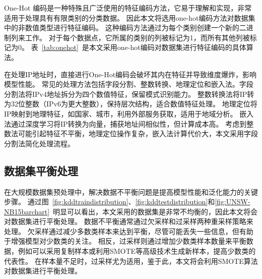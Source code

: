 One-Hot 编码是一种特殊且广泛使用的特征编码方法，它易于理解和实现，非常适用于处理具有有限类别的分类数据。
因此本文将选用one-hot编码方法对数据集中的非数值类型进行特征编码。
这种编码方法通过为每个类别创建一个新的二进制列来工作。
对于每个数据点，它所属的类别的列被标记为1，而所有其他列被标记为0。
表~\ref{tab:onehot}~是本文采用one-hot编码对数据集进行特征编码的具体算法。\par


在处理IP地址时，直接进行One-Hot编码会破坏其内在特征并导致维度爆炸，影响模型性能。
常见的处理方法包括字段分割、整数转换、地理定位和嵌入法。字段分割法将IPv4地址拆分为四个数值特征，保留模式识别能力。
整数转换法将IP转为32位整数（IPv6为更大整数），保持层次结构，适合数值特征处理。
地理定位将IP映射到地理特征，如国家、城市，利用外部服务获取，适用于地域分析。
嵌入法通过深度学习将IP转换为向量，捕获地址间相似性，但计算成本高。
考虑到整数法可能引起特征不平衡，地理定位操作复杂，嵌入法计算代价大，本文采用字段分割法简化处理流程。

\subsection{数据集平衡处理}
在大规模数据集预处理中，解决数据不平衡问题是提高模型性能和泛化能力的关键步骤。
通过图~\ref{fig:kddtraindistribution}、\ref{fig:kddtestdistribution}和\ref{fig:UNSW-NB15barchart}~明显可以看出，本文采用的数据集是非常不均衡的，因此本文将会对数据集进行平衡处理。
数据不平衡通常通过欠采样和过采样两种重采样策略来处理。
欠采样通过减少多数类样本来达到平衡，尽管可能丢失一些信息，但有助于增强模型对少数类的关注。
相反，过采样则通过增加少数类样本数量来平衡数据，例如可以采用复制样本或利用SMOTE等高级技术生成新样本，提高少数类的代表性。
在样本量不足时，过采样尤为适用，鉴于此，本文将会利用SMOTE算法对数据集进行平衡处理。\par


